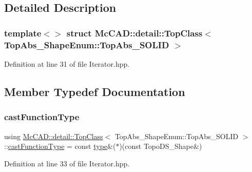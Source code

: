 \subsection{Detailed Description}
\subsubsection*{template$<$$>$\newline
struct Mc\+C\+A\+D\+::detail\+::\+Top\+Class$<$ Top\+Abs\+\_\+\+Shape\+Enum\+::\+Top\+Abs\+\_\+\+S\+O\+L\+I\+D $>$}



Definition at line 31 of file Iterator.\+hpp.



\subsection{Member Typedef Documentation}
\mbox{\label{structMcCAD_1_1detail_1_1TopClass_3_01TopAbs__ShapeEnum_1_1TopAbs__SOLID_01_4_afc3cda33c10b3d00b02265c587b28931}} 
\subsubsection{\texorpdfstring{cast\+Function\+Type}{castFunctionType}}
{\footnotesize\ttfamily using \hyperlink{structMcCAD_1_1detail_1_1TopClass}{Mc\+C\+A\+D\+::detail\+::\+Top\+Class}$<$ Top\+Abs\+\_\+\+Shape\+Enum\+::\+Top\+Abs\+\_\+\+S\+O\+L\+ID $>$\+::\hyperlink{structMcCAD_1_1detail_1_1TopClass_3_01TopAbs__ShapeEnum_1_1TopAbs__SOLID_01_4_afc3cda33c10b3d00b02265c587b28931}{cast\+Function\+Type} =  const \hyperlink{structMcCAD_1_1detail_1_1TopClass_3_01TopAbs__ShapeEnum_1_1TopAbs__SOLID_01_4_abfa1fdf68c51fe854dbd36332c8de9b5}{type}\&($\ast$)(const Topo\+D\+S\+\_\+\+Shape\&)}



Definition at line 33 of file Iterator.\+hpp.


